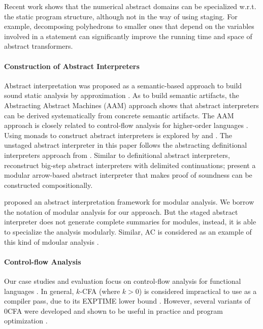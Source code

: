 Recent work shows that the numerical abstract domains can be
specialized w.r.t. the static program structure, although not in the
way of using staging. For example, decomposing polyhedrons
\cite{DBLP:conf/popl/SinghPV17, Singh:2017:PCD:3177123.3158143} to
smaller ones that depend on the variables involved in a statement can
significantly improve the running time and space of abstract
transformers.

\paragraph{Construction of Abstract Interpreters} Abstract interpretation
was proposed as a semantic-based approach to build sound static analysis by
approximation \cite{DBLP:conf/popl/CousotC77}. As to build semantic
artifacts, the Abstracting Abstract Machines (AAM)
\cite{DBLP:journals/jfp/HornM12, DBLP:conf/icfp/HornM10} approach
shows that abstract interpreters can be derived systematically from
concrete semantic artifacts. The AAM approach is closely related to
control-flow analysis for higher-order languages
\cite{Midtgaard:2012:CAF:2187671.2187672}.  Using monads to construct
abstract interpreters is explored by
\citet{Sergey:2013:MAI:2491956.2491979} and
\citet{DBLP:journals/pacmpl/DaraisLNH17,
  Darais:2015:GTM:2814270.2814308}.  The unstaged abstract interpreter
in this paper follows the abstracting definitional interpreters
approach from \citet{DBLP:journals/pacmpl/DaraisLNH17}.  Similar to
definitional abstract interpreters,
\citet{Wei:2018:RAA:3243631.3236800} reconstruct big-step abstract
interpreters with delimited continuations;
\citet{Keidel:2018:CSP:3243631.3236767} present a modular arrow-based
abstract interpreter that makes proof of soundness can be constructed
compositionally.

\citet{DBLP:conf/cc/CousotC02} proposed an abstract interpretation framework for
modular analysis. We borrow the notation of modular analysis for our approach.
But the staged abstract interpreter does not generate complete summaries for
modules, instead, it is able to specialize the analysis modularly. Similar, AC
is considered as an example of this kind of mdoular analysis \cite{DBLP:conf/cc/CousotC02}.

\paragraph{Control-flow Analysis} Our case studies and evaluation focus on
control-flow analysis for functional languages
\cite{Shivers:1991:SSC:115865.115884, Midtgaard:2012:CAF:2187671.2187672}. In
general, $k$-CFA (where $k > 0$) is considered impractical to use as a compiler
pass, due to its EXPTIME lower bound \cite{VanHorn:2008:DKC:1411204.1411243}.
However, several variants of 0CFA were developed and shown to be useful in
practice and program optimization \cite{Adams:2011:FTR:2048066.2048105,
Bergstrom:2014:PEH:2628136.2628153, ashley:practical, Reppy:2006:TCA:1159876.1159888}.

